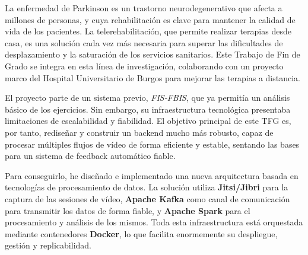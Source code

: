 
La enfermedad de Parkinson es un trastorno neurodegenerativo que afecta a millones de personas, y cuya rehabilitación es clave para mantener la calidad de vida de los pacientes. La telerehabilitación, que permite realizar terapias desde casa, es una solución cada vez más necesaria para superar las dificultades de desplazamiento y la saturación de los servicios sanitarios. Este Trabajo de Fin de Grado se integra en esta línea de investigación, colaborando con un proyecto marco del Hospital Universitario de Burgos para mejorar las terapias a distancia.

El proyecto parte de un sistema previo, \textit{FIS-FBIS}, que ya permitía un análisis básico de los ejercicios. Sin embargo, su infraestructura tecnológica presentaba limitaciones de escalabilidad y fiabilidad. El objetivo principal de este TFG es, por tanto, rediseñar y construir un backend mucho más robusto, capaz de procesar múltiples flujos de vídeo de forma eficiente y estable, sentando las bases para un sistema de feedback automático fiable.

Para conseguirlo, he diseñado e implementado una nueva arquitectura basada en tecnologías de procesamiento de datos. La solución utiliza \textbf{Jitsi/Jibri} para la captura de las sesiones de vídeo, \textbf{Apache Kafka} como canal de comunicación para transmitir los datos de forma fiable, y \textbf{Apache Spark} para el procesamiento y análisis de los mismos. Toda esta infraestructura está orquestada mediante contenedores \textbf{Docker}, lo que facilita enormemente su despliegue, gestión y replicabilidad.